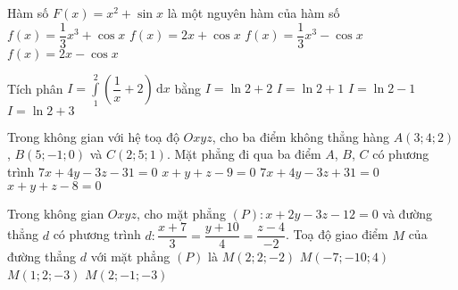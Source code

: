 \begin{ex}%
	Hàm số $F(x)=x^2+\sin x$ là một nguyên hàm của hàm số
	\choice
	{$f(x)=\dfrac{1}{3}x^3+\cos x$}
	{\True $f(x)=2x+\cos x$}
	{$f(x)=\dfrac{1}{3}x^3-\cos x$}
	{$f(x)=2x-\cos x$}
\end{ex}

\begin{ex}%
	Tích phân $I=\displaystyle\int\limits_1^2 \left(\dfrac{1}{x}+2\right) \mathrm{\,d}x$ bằng
	\choice
	{\True $I=\ln 2+2$}
	{$I=\ln 2+1$}
	{$I=\ln 2-1$}
	{$I=\ln 2+3$}
\end{ex}

\begin{ex}%
	Trong không gian với hệ toạ độ $Oxyz$, cho ba điểm không thẳng hàng $A(3;4;2)$, $B\left(5;-1;0\right)$ và $C(2;5;1)$. Mặt phẳng đi qua ba điểm $A$, $B$, $C$ có phương trình
	\choice
	{\True $7x+4y-3z-31=0$}
	{$x+y+z-9=0$}
	{$7x+4y-3z+31=0$}
	{$x+y+z-8=0$}
\end{ex}

\begin{ex}%
	Trong không gian $Oxyz$, cho mặt phẳng $(P)\colon x+2y-3z-12=0$ và đường thẳng $d$ có phương trình $d\colon  \dfrac{x+7}{3}=\dfrac{y+10}{4}=\dfrac{z-4}{-2}$. Toạ độ giao điểm $M$ của đường thẳng $d$ với mặt phẳng $(P)$ là
	\choice
	{\True $M(2;2;-2)$}
	{$M(-7;-10;4)$}
	{$M(1;2;-3)$}
	{$M(2;-1;-3)$}
\end{ex}

